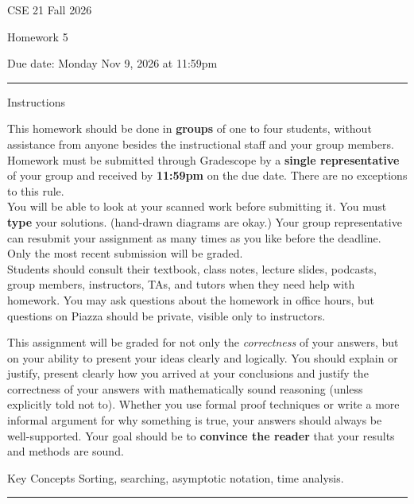 \documentclass[10pt,letterpaper,unboxed,cm]{article}
\begin{document}
\hfill{CSE 21 Fall 2026}

\hfill{Homework 5}

\hfill{Due date: Monday Nov 9, 2026 at 11:59pm}

\begin{center}
\begin{minipage}[t]{5.7in}
\rule{\linewidth}{2pt}
{\sc Instructions}\newline

This homework should be done in {\bf groups} of one to four students, without assistance from anyone besides the instructional staff and your group members.  Homework must be submitted through Gradescope by a {\bf single representative} of your group and received by {\bf 11:59pm} on the due date. There are no exceptions to this rule.\\
 
You will be able to look at your scanned work before submitting it. 
 You must {\bf type} your solutions. (hand-drawn diagrams are okay.)
 Your group representative can resubmit your assignment as many times as you like before the deadline. Only the most recent submission will be graded.\\

Students should consult their textbook, class notes, lecture slides, podcasts, group members, instructors, TAs, and tutors when 
they need help with homework. You may ask questions about the homework in office hours, but questions on Piazza should be private, visible only to instructors. 

This assignment will be graded for not only the \emph{correctness} of your answers, but on your ability to present your ideas clearly and logically. You should explain or justify, present clearly how you arrived at your conclusions and justify the correctness of your answers with mathematically sound reasoning (unless explicitly told not to). Whether you use formal proof techniques or write a more informal argument for why something is true, your answers should always be well-supported. Your goal should be to {\bf convince the reader} that your results and methods are sound.






{\sc Key Concepts} Sorting, searching, asymptotic notation, time analysis.



\rule{\linewidth}{2pt}
\end{minipage} \hfill

\end{center}
\newpage
\end{document}
